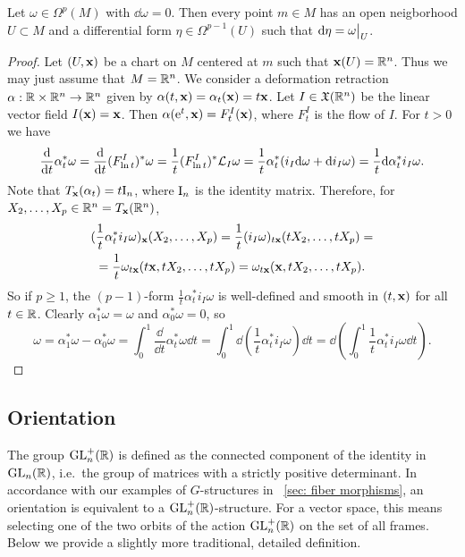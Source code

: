 \begin{thm}\label{lem poincare classic}
    Let $\omega\in\Omega^p(M)$ with $\dd\omega=0$. Then every point $m\in M$ has an open neigborhood $U\subset M$ and a differential form $\eta\in\Omega^{p-1}(U)$ such that $\dd\eta=\restr{\omega}{U}$.
\end{thm}
\begin{proof}
    Let $(U,\bf{x})$ be a chart on $M$ centered at $m$ such that $\bf{x}(U)=\bbR^n$. Thus we may just assume that $M=\bbR^n$. We consider a deformation retraction $\alpha:\bbR\times\bbR^n\to \bbR^n$ given by $\alpha(t,\bf{x})=\alpha_t(\bf{x})=t\bf{x}$. Let $I\in \fX(\bbR^n)$ be the linear vector field $I(\bf{x})=\bf{x}$. Then $\alpha(\rme^t,\bf{x})=F^I_t(\bf{x})$, where $F^I_t$ is the flow of $I$. For $t>0$ we have 
    \[\frac{\dd}{\dd t}\alpha_t^\ast\omega=\frac{\dd}{\dd t}(F^I_{\ln t})^\ast\omega=\frac{1}{t}(F^I_{\ln t})^\ast \Lie_{I}\omega=\frac{1}{t}\alpha_t^\ast(i_{I}\dd\omega+\dd i_{I}\omega)=\frac{1}{t}\dd\alpha_t^\ast i_{I}\omega.\]
    Note that $T_{\bf{x}}(\alpha_t)=t\rmI_n$, where $\rmI_n$ is the identity matrix. Therefore, for $X_2,\ldots,X_p\in \bbR^n=T_{\bf{x}}(\bbR^n)$,
    \begin{multline}
        (\frac{1}{t}\alpha_t^\ast i_{I}\omega)_{\bf{x}}(X_2,\ldots,X_p)=\frac{1}{t}(i_I\omega)_{t\bf{x}}(tX_2,\ldots,tX_p)=\\
        =\frac{1}{t}\omega_{t\bf{x}}(t\bf{x},tX_2,\ldots,tX_p)=\omega_{t\bf{x}}(\bf{x},tX_2,\ldots,tX_p).
    \end{multline}
    So if $p\geq 1$, the $(p-1)$-form $\frac{1}{t}\alpha^\ast_t i_I\omega$ is well-defined and smooth in $(t,\bf{x})$ for all $t\in\bbR$. Clearly $\alpha^\ast_1\omega=\omega$ and $\alpha^\ast_0\omega=0$, so 
    \[\omega=\alpha_1^\ast\omega-\alpha^\ast_0\omega=\int_0^1\frac{\dd}{\dd t}\alpha_t^\ast\omega\dd t=\int_0^1\dd \left(\frac{1}{t}\alpha_t^\ast i_I\omega\right)\dd t=\dd \left(\int_0^1\frac{1}{t}\alpha_t^\ast i_I\omega\dd t\right).\]
\end{proof}




\subsection{Orientation}

The group $\GL^+_n(\bbR )$ is defined as the connected component of the identity in $\GL_n(\bbR )$, i.e.\ the group of matrices with a strictly positive determinant. In accordance with our examples of $G$-structures in \sect~\ref{sec: fiber morphisms}, an orientation is equivalent to a $\GL_n^+(\bbR)$-structure. For a vector space, this means selecting one of the two orbits of the action $\GL_n^+(\bbR)$ on the set of all frames. Below we provide a slightly more traditional, detailed definition.

